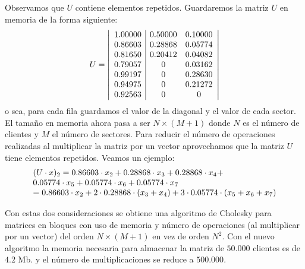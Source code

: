 Observamos que $U$ contiene elementos repetidos. Guardaremos la matriz $U$
en memoria de la forma siguiente:
\begin{displaymath}
U = \left|
\begin{array}{c|cc}
 1.00000 & 0.50000 & 0.10000 \cr
 0.86603 & 0.28868 & 0.05774 \cr
 0.81650 & 0.20412 & 0.04082 \cr
 0.79057 & 0       & 0.03162 \cr
 0.99197 & 0       & 0.28630 \cr
 0.94975 & 0       & 0.21272 \cr
 0.92563 & 0       & 0
\end{array}
\right|
\end{displaymath}
o sea, para cada fila guardamos el valor de la diagonal y el valor de
cada sector. El tama\~no en memoria ahora pasa a ser $N \times (M+1)$
donde $N$ es el n\'umero de clientes y $M$ el n\'umero de sectores.
\newline
\newline
Para reducir el n\'umero de operaciones realizadas al multiplicar la
matriz por un vector aprovechamos que la matriz $U$ tiene elementos
repetidos. Veamos un ejemplo:
\begin{displaymath}
\begin{array}{l}
(U \cdot x)_2 =  0.86603 \cdot x_2 + 0.28868 \cdot x_3 + 0.28868 \cdot x_4 + \cr
                 0.05774 \cdot x_5 + 0.05774 \cdot x_6 + 0.05774 \cdot x_7 \cr
              = 0.86603 \cdot x_2 + 2\cdot 0.28868 \cdot (x_3 + x_4) + 3 \cdot 0.05774 \cdot (x_5 + x_6 + x_7)
\end{array}
\end{displaymath}

Con estas dos consideraciones se obtiene una algoritmo de Cholesky para matrices
en bloques con uso de memoria y n\'umero de operaciones (al multiplicar por un
vector) del orden $N \times (M+1)$ en vez de orden $N^2$. Con el nuevo algoritmo
la memoria necesaria para almacenar la matriz de $50.000$ clientes es de $4.2$ Mb.
y el n\'umero de multiplicaciones se reduce a $500.000$.
